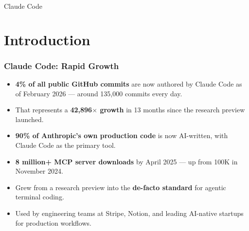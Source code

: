 \begin{frame}[fragile]\frametitle{}

\begin{center}
{\Large Claude Code}
\end{center}
\end{frame}

\section{Introduction}
\begin{frame}[fragile]\frametitle{Claude Code: Rapid Growth}
  \begin{itemize}
    \item \textbf{4\% of all public GitHub commits} are now authored by Claude Code as of February 2026 --- around 135,000 commits every day.
    \item That represents a \textbf{42,896$\times$ growth} in 13 months since the research preview launched.
    \item \textbf{90\% of Anthropic's own production code} is now AI-written, with Claude Code as the primary tool.
    \item \textbf{8 million+ MCP server downloads} by April 2025 --- up from 100K in November 2024.
    \item Grew from a research preview into the \textbf{de-facto standard} for agentic terminal coding.
    \item Used by engineering teams at Stripe, Notion, and leading AI-native startups for production workflows.
  \end{itemize}
\end{frame}


